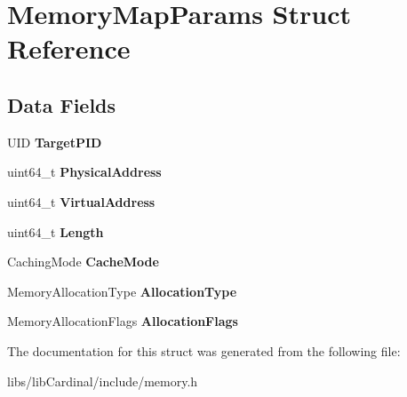 \hypertarget{structMemoryMapParams}{}\section{Memory\+Map\+Params Struct Reference}
\label{structMemoryMapParams}
\subsection*{Data Fields}
\begin{DoxyCompactItemize}
\item 
U\+ID {\bfseries Target\+P\+ID}\hypertarget{structMemoryMapParams_a07f7f95d27c1b2c6e34ba4e67556e717}{}\label{structMemoryMapParams_a07f7f95d27c1b2c6e34ba4e67556e717}

\item 
uint64\+\_\+t {\bfseries Physical\+Address}\hypertarget{structMemoryMapParams_ad0f42ca2d682396f3ac94d90884f001a}{}\label{structMemoryMapParams_ad0f42ca2d682396f3ac94d90884f001a}

\item 
uint64\+\_\+t {\bfseries Virtual\+Address}\hypertarget{structMemoryMapParams_a2e894751aa3b4360d13ead79179af861}{}\label{structMemoryMapParams_a2e894751aa3b4360d13ead79179af861}

\item 
uint64\+\_\+t {\bfseries Length}\hypertarget{structMemoryMapParams_abe8a986a56d2f182924ece2f6c487d4f}{}\label{structMemoryMapParams_abe8a986a56d2f182924ece2f6c487d4f}

\item 
Caching\+Mode {\bfseries Cache\+Mode}\hypertarget{structMemoryMapParams_a92c32547b4902dc265686624c2b3cbb4}{}\label{structMemoryMapParams_a92c32547b4902dc265686624c2b3cbb4}

\item 
Memory\+Allocation\+Type {\bfseries Allocation\+Type}\hypertarget{structMemoryMapParams_a2a51d767864219e5701e520630d42f2e}{}\label{structMemoryMapParams_a2a51d767864219e5701e520630d42f2e}

\item 
Memory\+Allocation\+Flags {\bfseries Allocation\+Flags}\hypertarget{structMemoryMapParams_ac264141ac02954f33c055219635961a3}{}\label{structMemoryMapParams_ac264141ac02954f33c055219635961a3}

\end{DoxyCompactItemize}


The documentation for this struct was generated from the following file\+:\begin{DoxyCompactItemize}
\item 
libs/lib\+Cardinal/include/memory.\+h\end{DoxyCompactItemize}
